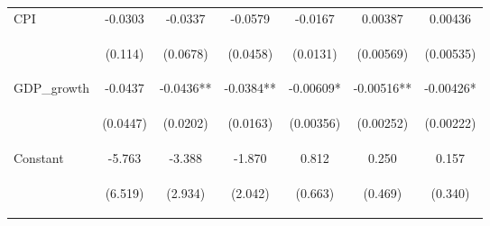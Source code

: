 \documentclass[]{article}
\begin{document}
\begin{center}
\begin{tabular}{lcccccc}
CPI & -0.0303 & -0.0337 & -0.0579 & -0.0167 & 0.00387 & 0.00436 \\
\vspace{4pt} & \begin{footnotesize}(0.114)\end{footnotesize} & \begin{footnotesize}(0.0678)\end{footnotesize} & \begin{footnotesize}(0.0458)\end{footnotesize} & \begin{footnotesize}(0.0131)\end{footnotesize} & \begin{footnotesize}(0.00569)\end{footnotesize} & \begin{footnotesize}(0.00535)\end{footnotesize} \\
GDP\_growth & -0.0437 & -0.0436** & -0.0384** & -0.00609* & -0.00516** & -0.00426* \\
\vspace{4pt} & \begin{footnotesize}(0.0447)\end{footnotesize} & \begin{footnotesize}(0.0202)\end{footnotesize} & \begin{footnotesize}(0.0163)\end{footnotesize} & \begin{footnotesize}(0.00356)\end{footnotesize} & \begin{footnotesize}(0.00252)\end{footnotesize} & \begin{footnotesize}(0.00222)\end{footnotesize} \\
Constant & -5.763 & -3.388 & -1.870 & 0.812 & 0.250 & 0.157 \\
 & \begin{footnotesize}(6.519)\end{footnotesize} & \begin{footnotesize}(2.934)\end{footnotesize} & \begin{footnotesize}(2.042)\end{footnotesize} & \begin{footnotesize}(0.663)\end{footnotesize} & \begin{footnotesize}(0.469)\end{footnotesize} & \begin{footnotesize}(0.340)\end{footnotesize} \\

\end{tabular}
\end{center}
\end{document}
